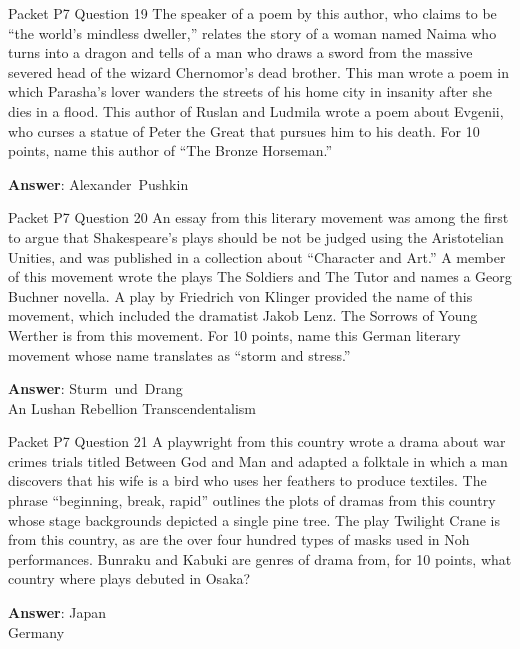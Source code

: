 \begin{frame}{Packet P7 Question 19}
The speaker of a poem by this author, who claims to be “the world's mindless dweller,” relates the story of a woman named Naima who turns into a dragon and tells of a man who draws a sword from the massive severed head of the wizard Chernomor’s dead brother. This man wrote a poem in which Parasha’s lover wanders the streets of his home city   in insanity after she dies in a flood. This author of Ruslan and Ludmila wrote     a poem about Evgenii, who curses a statue of Peter the Great   that pursues him to his death. For 10 points, name this author of “The Bronze Horseman.”

\textbf{Answer}: Alexander\ Pushkin\\
\end{frame}

\begin{frame}{Packet P7 Question 20}
An essay from this literary     movement was among the first to argue that Shakespeare’s plays should be not be judged using the Aristotelian Unities, and was published in a collection about “Character and Art.” A member of this movement wrote the plays The Soldiers and The Tutor and names a Georg Buchner novella. A play by Friedrich von Klinger provided the name   of this movement, which   included the dramatist Jakob Lenz. The Sorrows of Young Werther is from this movement. For 10 points, name this German   literary movement whose name translates as “storm and stress.”

\textbf{Answer}: Sturm\ und\ Drang\\
 An Lushan Rebellion
 Transcendentalism
\end{frame}

\begin{frame}{Packet P7 Question 21}
A playwright from this country wrote a drama   about war crimes   trials titled Between   God and Man and adapted a folktale in which a man discovers that his wife is a   bird who uses her feathers to produce textiles. The phrase “beginning, break, rapid” outlines the plots of dramas from this country whose stage backgrounds depicted a single pine tree. The play Twilight Crane is from this country, as are the over four hundred types of masks used   in Noh performances. Bunraku and Kabuki are genres of drama from, for 10 points, what country where plays debuted in Osaka?

\textbf{Answer}: Japan\\
 Germany
\end{frame}

